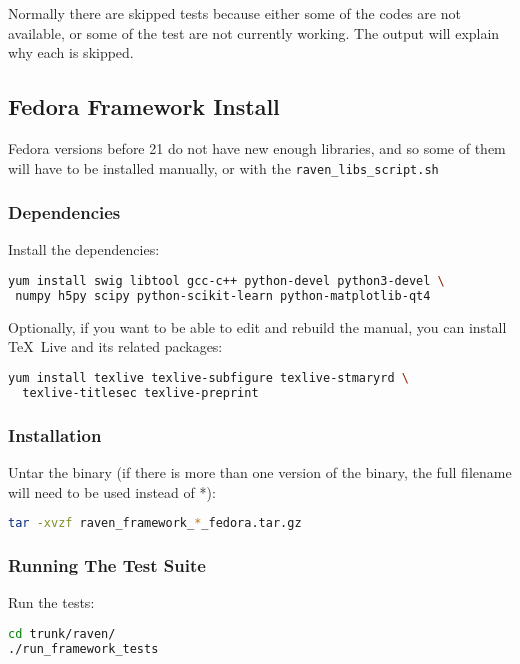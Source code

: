 Normally there are skipped tests because either some of the codes are
not available, or some of the test are not currently working.  The
output will explain why each is skipped.

\subsection{Fedora Framework Install}

Fedora versions before 21 do not have new enough libraries, and so
some of them will have to be installed manually, or with the
\verb'raven_libs_script.sh'

\subsubsection{Dependencies}
Install the dependencies:

\begin{lstlisting}[language=bash]
yum install swig libtool gcc-c++ python-devel python3-devel \
 numpy h5py scipy python-scikit-learn python-matplotlib-qt4
\end{lstlisting}

Optionally, if you want to be able to edit and rebuild the manual, you can
install \TeX~Live and its related packages:
\begin{lstlisting}[language=bash]
yum install texlive texlive-subfigure texlive-stmaryrd \
  texlive-titlesec texlive-preprint
\end{lstlisting}

\subsubsection{Installation}
Untar the binary (if there is more than one version of the
binary, the full filename will need to be used instead of *):

\begin{lstlisting}[language=bash]
tar -xvzf raven_framework_*_fedora.tar.gz
\end{lstlisting}

\subsubsection{Running The Test Suite}
Run the tests:

\begin{lstlisting}[language=bash]
cd trunk/raven/
./run_framework_tests
\end{lstlisting}

